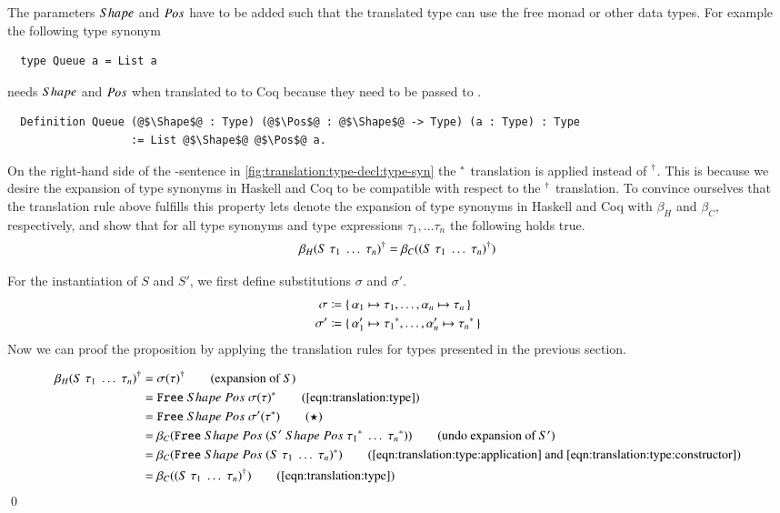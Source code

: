 The parameters $Shape$ and $Pos$ have to be added such that the translated type can use the free monad or other data types.
For example the following type synonym
\begin{verbatim}
  type Queue a = List a
\end{verbatim}
needs $Shape$ and $Pos$ when translated to to Coq because they need to be passed to .
\begin{verbatim}
  Definition Queue (@$\Shape$@ : Type) (@$\Pos$@ : @$\Shape$@ -> Type) (a : Type) : Type
                   := List @$\Shape$@ @$\Pos$@ a.
\end{verbatim}

On the right-hand side of the -sentence in \autoref{fig:translation:type-decl:type-syn} the ${}^{*}$ translation is applied instead of ${}^{\dagger}$.
This is because we desire the expansion of type synonyms in Haskell and Coq to be compatible with respect to the ${}^{\dagger}$ translation.
To convince ourselves that the translation rule above fulfills this property lets denote the expansion of type synonyms in Haskell and Coq with $\beta_H$ and $\beta_C$, respectively, and show that for all type synonyms  and type expressions $\tau_1, \ldots \tau_n$ the following holds true.
\[
  {\beta_H(S\;\tau_1\;\ldots\;\tau_n)}^{\dagger}
  = \beta_C({(S\;\tau_1\;\ldots\;\tau_n)}^{\dagger})
\]

For the instantiation of $S$ and $S'$, we first define substitutions $\sigma$ and $\sigma'$.
\begin{align*}
  \sigma &\coloneqq \{\, \alpha_1 \mapsto \tau_1, \ldots, \alpha_n \mapsto \tau_n \,\} \\
  \sigma' &\coloneqq \{\, \alpha_1' \mapsto {\tau_1}^{*}, \ldots, \alpha_n' \mapsto {\tau_n}^{*} \,\}
\end{align*}
Now we can proof the proposition by applying the translation rules for types presented in the previous section.

\begin{align*}
  \toCoq{\beta_H(S\;\tau_1\;\ldots\;\tau_n)}
    &= \toCoq{\sigma(\tau)}
       \tag{expansion of $S$} \\
    &= \Free{\toCoqT{\sigma(\tau)}}
       \tag{\autoref{eqn:translation:type}} \\
    &= \Free{\sigma'(\toCoqT{\tau})}
       \tag{$\star$} \\
    &= \beta_C{(\Free{(\genApply{S'}\;\toCoqT{\tau_1}\;\ldots\;\toCoqT{\tau_n})})}
       \tag{undo expansion of $S'$} \\
    &= \beta_C{(\Free{\toCoqT{(S\;\tau_1\;\ldots\;\tau_n)}})}
       \tag{\autoref{eqn:translation:type:application} and \ref{eqn:translation:type:constructor}} \\
    &= \beta_C(\toCoq{(S\;\tau_1\;\ldots\;\tau_n)})
       \tag{\autoref{eqn:translation:type}}
\end{align*}
\qed

